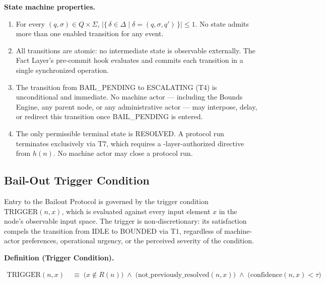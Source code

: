 \bigskip
\noindent\textbf{State machine properties.}

\begin{enumerate}\itemsep=0pt
\item[\textbf{Determinism.}] For every $(q, \sigma) \in Q \times \Sigma$, $|\{\,\delta \in \Delta \mid \delta = (q, \sigma, q')\,\}| \leq 1$. No state admits more than one enabled transition for any event.

\item[\textbf{Atomicity.}] All transitions are atomic: no intermediate state is observable externally. The Fact Layer's pre-commit hook evaluates and commits each transition in a single synchronized operation.

\item[\textbf{Irreversibility of T4.}] The transition from BAIL\_PENDING to ESCALATING (T4) is unconditional and immediate. No machine actor --- including the Bounds Engine, any parent node, or any administrative actor --- may interpose, delay, or redirect this transition once BAIL\_PENDING is entered.

\item[\textbf{Single terminus.}] The only permissible terminal state is RESOLVED. A protocol run terminates exclusively via T7, which requires a \purpose-layer-authorized directive from $h(n)$. No machine actor may close a protocol run.
\end{enumerate}

\subsection{Bail-Out Trigger Condition}\label{sec:trigger-condition}

Entry to the Bailout Protocol is governed by the trigger condition $\text{TRIGGER}(n, x)$, which is evaluated against every input element $x$ in the node's observable input space. The trigger is non-discretionary: its satisfaction compels the transition from IDLE to BOUNDED via T1, regardless of machine-actor preferences, operational urgency, or the perceived severity of the condition.

\bigskip
\noindent\textbf{Definition (Trigger Condition).}

\begin{align}
\text{TRIGGER}(n, x) &\;\equiv\; \bigl(x \notin R(n)\bigr) \;\land\; \bigl(\text{not\_previously\_resolved}(n, x)\bigr) \;\land\; \bigl(\text{confidence}(n, x) < \tau\bigr) \tag{TC}
\end{align}

